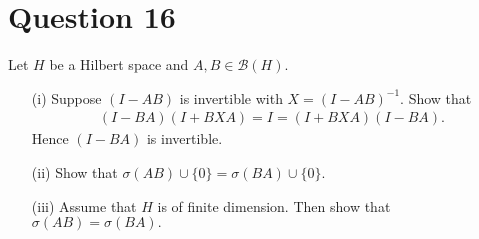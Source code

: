 \section{Question 16}

\horz

Let $H$ be a Hilbert space and $A,B \in \mathcal B(H).$

\begin{itemize}
\item[(i)] Suppose $(I-AB)$ is invertible with $X= (I-AB)^{-1}.$ Show that 
\begin{align*}
(I-BA)(I+BXA)= I= (I+BXA)(I-BA).
\end{align*}
Hence $(I-BA)$ is invertible.
\item[(ii)] Show that $\sigma(AB)\cup \{0\} = \sigma (BA) \cup \{0\}.$
\item[(iii)] Assume that $H$ is of finite dimension. Then show that 
$\sigma(AB)= \sigma (BA).$
\end{itemize}

\horz

